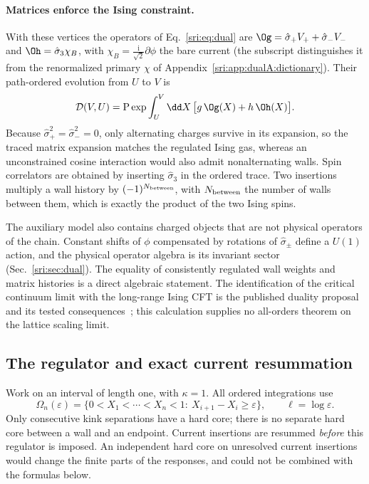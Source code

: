 \paragraph{Matrices enforce the Ising constraint.} With these vertices the operators of Eq.~\eqref{sri:eq:dual} are
$\Og=\hat\sigma_+V_++\hat\sigma_-V_-$ and $\Oh=\hat\sigma_3\chi_B$, with $\chi_B=\frac{\mathrm i}{\sqrt2}\partial\phi$
the bare current (the subscript distinguishes it from the renormalized primary $\chi$ of
Appendix~\ref{sri:app:dualA:dictionary}). Their path-ordered evolution from $U$ to $V$ is
\begin{equation}
 \mathcal D(V,U)=\mathrm P\exp\int_U^V\dd X\,\bigl[g\,\Og(X)+h\,\Oh(X)\bigr].
\end{equation}
Because $\hat\sigma_+^2=\hat\sigma_-^2=0$, only alternating charges survive in its expansion, so the traced matrix
expansion matches the regulated Ising gas, whereas an unconstrained cosine interaction would also admit nonalternating
walls. Spin correlators are obtained by inserting $\hat\sigma_3$ in the ordered trace. Two insertions multiply a wall
history by $(-1)^{N_{\rm between}}$, with $N_{\rm between}$ the number of walls between them, which is exactly the
product of the two Ising spins.

The auxiliary model also contains charged objects that are not physical operators of the chain. Constant shifts of
$\phi$ compensated by rotations of $\hat\sigma_\pm$ define a $U(1)$ action, and the physical operator algebra is its
invariant sector (Sec.~\ref{sri:sec:dual}). The equality of consistently regulated wall weights and matrix histories is a
direct algebraic statement. The identification of the critical continuum limit with the long-range Ising CFT is the
published duality proposal and its tested consequences~\cite{sri:Benedetti:2025nzp}; this calculation supplies no
all-orders theorem on the lattice scaling limit.

\subsection{The regulator and exact current resummation}\label{sri:app:dualA:regulator}
Work on an interval of length one, with $\kappa=1$. All ordered integrations use
\begin{equation}
 \Omega_n(\varepsilon)=\{0<X_1<\cdots<X_n<1:\ X_{i+1}-X_i\ge\varepsilon\},\qquad \ell=\log\varepsilon.
 \label{sri:eq:dualA:domain}
\end{equation}
Only consecutive kink separations have a hard core; there is no separate hard core between a wall and an endpoint.
Current insertions are resummed \emph{before} this regulator is imposed. An independent hard core on unresolved
current insertions would change the finite parts of the responses, and could not be combined with the formulas below.

